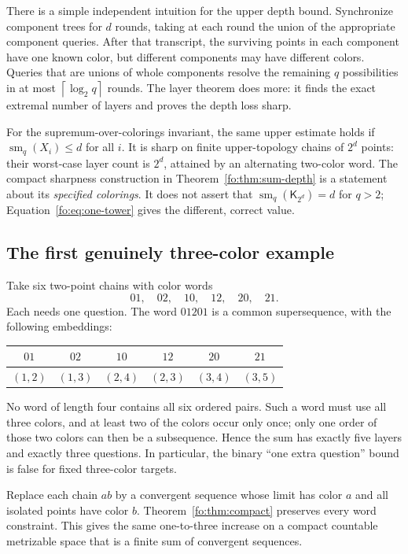 \documentclass[11pt,letterpaper]{article}
\numberwithin{equation}{section}
\theoremstyle{definition}
\theoremstyle{remark}
\theoremstyle{definition}
\newcommand{\ceil}[1]{\left\lceil#1\right\rceil}
\newcommand{\smq}{\operatorname{sm}_{q}}
\newcommand{\Tw}{\mathsf K}
\begin{document}
There is a simple independent intuition for the upper depth bound. Synchronize
component trees for $d$ rounds, taking at each round the union of the appropriate
component queries. After that transcript, the surviving points in each
component have one known color, but different components may have different
colors. Queries that are unions of whole components resolve the remaining
$q$ possibilities in at most $\ceil{\log_2q}$ rounds. The layer theorem does more:
it finds the exact extremal number of layers and proves the depth loss sharp.

For the supremum-over-colorings invariant, the same upper estimate holds if
$\smq(X_i)\le d$ for all $i$. It is sharp on finite upper-topology chains of
$2^d$ points: their worst-case layer count is $2^d$, attained by an alternating
two-color word. The compact sharpness construction in Theorem~\ref{fo:thm:sum-depth}
is a statement about its \emph{specified colorings}. It does not assert that
$\smq(\Tw_{2^d})=d$ for $q>2$; Equation~\eqref{fo:eq:one-tower} gives the different,
correct value.

\subsection{The first genuinely three-color example}
\label{fo:sec:three-colors}

Take six two-point chains with color words
\[
 01,\quad02,\quad10,\quad12,\quad20,\quad21.
\]
Each needs one question. The word $01201$ is a common supersequence, with the
following embeddings:
\begin{center}
\begin{tabular}{@{}cccccc@{}}
\toprule
$01$ & $02$ & $10$ & $12$ & $20$ & $21$\\
\midrule
$(1,2)$ & $(1,3)$ & $(2,4)$ & $(2,3)$ & $(3,4)$ & $(3,5)$\\
\bottomrule
\end{tabular}
\end{center}
No word of length four contains all six ordered pairs. Such a word must use all
three colors, and at least two of the colors occur only once; only one order of
those two colors can then be a subsequence. Hence the sum has exactly five
layers and exactly three questions. In particular, the binary ``one extra
question'' bound is false for fixed three-color targets.

Replace each chain $ab$ by a convergent sequence whose limit has color $a$ and
all isolated points have color $b$. Theorem~\ref{fo:thm:compact} preserves every
word constraint. This gives the same one-to-three increase on a compact
countable metrizable space that is a finite sum of convergent sequences.
\end{document}
